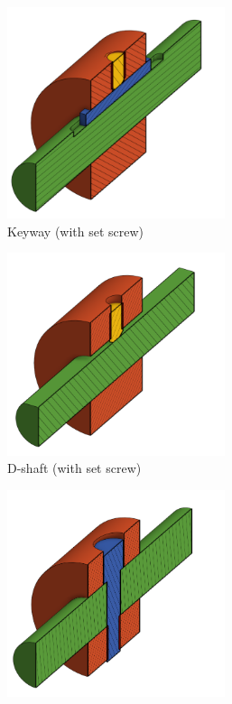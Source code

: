 \documentclass[10pt,letterpaper]{book}
\begin{document}
	\begin{figure}[H]
		\centering
		\begin{subfigure}[b]{.32\linewidth}
			\includegraphics[width=0.7\textwidth]{imgs/keyedshaft.png}
			\caption{Keyway (with set screw)}
		\end{subfigure}
		\begin{subfigure}[b]{.32\linewidth}
			\includegraphics[width=0.7\textwidth]{imgs/dshaft.png}
			\caption{D-shaft (with set screw)}
		\end{subfigure}
		\begin{subfigure}[b]{.32\linewidth}
			\includegraphics[width=0.7\textwidth]{imgs/pinnedshaft.png}

\end{subfigure}
\end{figure}
\end{document}
